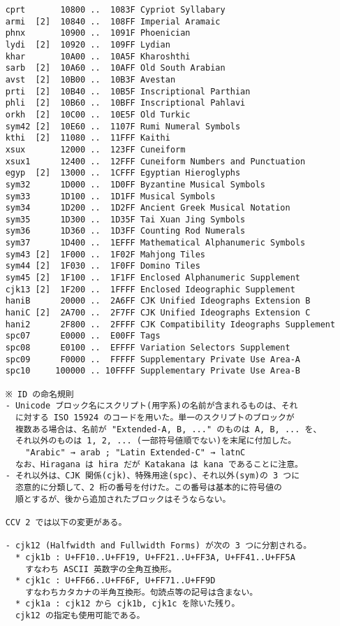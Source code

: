 \documentclass[uplatex,dvipdfmx,a4paper]{jsarticle}
\begin{document}
\begin{verbatim}
    cprt       10800 ..  1083F Cypriot Syllabary
    armi  [2]  10840 ..  108FF Imperial Aramaic
    phnx       10900 ..  1091F Phoenician
    lydi  [2]  10920 ..  109FF Lydian
    khar       10A00 ..  10A5F Kharoshthi
    sarb  [2]  10A60 ..  10AFF Old South Arabian
    avst  [2]  10B00 ..  10B3F Avestan
    prti  [2]  10B40 ..  10B5F Inscriptional Parthian
    phli  [2]  10B60 ..  10BFF Inscriptional Pahlavi
    orkh  [2]  10C00 ..  10E5F Old Turkic
    sym42 [2]  10E60 ..  1107F Rumi Numeral Symbols
    kthi  [2]  11080 ..  11FFF Kaithi
    xsux       12000 ..  123FF Cuneiform
    xsux1      12400 ..  12FFF Cuneiform Numbers and Punctuation
    egyp  [2]  13000 ..  1CFFF Egyptian Hieroglyphs
    sym32      1D000 ..  1D0FF Byzantine Musical Symbols
    sym33      1D100 ..  1D1FF Musical Symbols
    sym34      1D200 ..  1D2FF Ancient Greek Musical Notation
    sym35      1D300 ..  1D35F Tai Xuan Jing Symbols
    sym36      1D360 ..  1D3FF Counting Rod Numerals
    sym37      1D400 ..  1EFFF Mathematical Alphanumeric Symbols
    sym43 [2]  1F000 ..  1F02F Mahjong Tiles
    sym44 [2]  1F030 ..  1F0FF Domino Tiles
    sym45 [2]  1F100 ..  1F1FF Enclosed Alphanumeric Supplement
    cjk13 [2]  1F200 ..  1FFFF Enclosed Ideographic Supplement
    haniB      20000 ..  2A6FF CJK Unified Ideographs Extension B
    haniC [2]  2A700 ..  2F7FF CJK Unified Ideographs Extension C
    hani2      2F800 ..  2FFFF CJK Compatibility Ideographs Supplement
    spc07      E0000 ..  E00FF Tags
    spc08      E0100 ..  EFFFF Variation Selectors Supplement
    spc09      F0000 ..  FFFFF Supplementary Private Use Area-A
    spc10     100000 .. 10FFFF Supplementary Private Use Area-B

    ※ ID の命名規則
    - Unicode ブロック名にスクリプト(用字系)の名前が含まれるものは、それ
      に対する ISO 15924 のコードを用いた。単一のスクリプトのブロックが
      複数ある場合は、名前が "Extended-A, B, ..." のものは A, B, ... を、
      それ以外のものは 1, 2, ... (一部符号値順でない)を末尾に付加した。
        "Arabic" → arab ; "Latin Extended-C" → latnC
      なお、Hiragana は hira だが Katakana は kana であることに注意。
    - それ以外は、CJK 関係(cjk)、特殊用途(spc)、それ以外(sym)の 3 つに
      恣意的に分類して、2 桁の番号を付けた。この番号は基本的に符号値の
      順とするが、後から追加されたブロックはそうならない。

    CCV 2 では以下の変更がある。

    - cjk12 (Halfwidth and Fullwidth Forms) が次の 3 つに分割される。
      * cjk1b : U+FF10..U+FF19, U+FF21..U+FF3A, U+FF41..U+FF5A
        すなわち ASCII 英数字の全角互換形。
      * cjk1c : U+FF66..U+FF6F, U+FF71..U+FF9D
        すなわちカタカナの半角互換形。句読点等の記号は含まない。
      * cjk1a : cjk12 から cjk1b, cjk1c を除いた残り。
      cjk12 の指定も使用可能である。


\end{verbatim}
\end{document}
